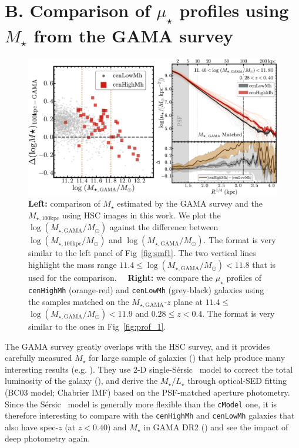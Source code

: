 \documentclass[a4paper,fleqn,usenatbib]{mnras}
\def\ser{{S\'{e}rsic\ }}
\def\rbcg{\texttt{cenHighMh}}
\def\nbcg{\texttt{cenLowMh}}
\def\mstar{{$M_{\star}$}}
\def\mtot{{$M_{\star,100\mathrm{kpc}}$}}
\def\mgama{{$M_{\star,\mathrm{GAMA}}$}}
\def\logmtot{{$\log (M_{\star,100\mathrm{kpc}}/M_{\odot})$}}
\def\logmgama{{$\log (M_{\star,\mathrm{GAMA}}/M_{\odot})$}}
\def\m2l{{$M_{\star}/L_{\star}$}}
\def\mden{{$\mu_{\star}$}}
\begin{document}
\section{B. Comparison of \mden{} profiles using \mstar{} from the GAMA survey}
    \label{app:gama} 

\begin{figure}
    \centering
    \includegraphics[width=\textwidth]{fig/redbcg_prof_gama_new}
    \caption{
        \textbf{Left:} comparison of \mstar{} estimated by the GAMA survey and 
        the \mtot{} using HSC images in this work. 
        We plot the \logmgama{} against the difference between \logmtot{} and \logmgama{}. 
        The format is very similar to the left panel of Fig~\ref{fig:smf1}. 
        The two vertical lines highlight the mass range $11.4 \leq$\logmgama{}$<11.8$ 
        that is used for the comparison.~~
        \textbf{Right:} we compare the \mden{} profiles of \rbcg{} (orange-red) and 
        \nbcg{} (grey-black) galaxies using the samples matched on the 
        \mgama{}-$z$ plane at $11.4 \leq$\logmgama{}$<11.9$ and $0.28 \leq z < 0.4$. 
        The format is very similar to the ones in Fig~\ref{fig:prof_1}.}
    \label{fig:gama}
\end{figure}

    The GAMA survey greatly overlaps with the HSC survey, and it provides carefully 
    measured \mstar{} for large sample of galaxies (\citealt{Taylor2011}) that help 
    produce many interesting results (e.g. \citealt{Bauer2013, Ferreras2017}).
    They use 2-D single-\ser{} model to correct the total luminosity of the galaxy 
    (\citealt{Kelvin2012}), and derive the \m2l{} through optical-SED fitting 
    (BC03 model; Chabrier IMF) based on the PSF-matched aperture photometry. 
    Since the \ser{} model is generally more flexible than the \texttt{cModel} one, 
    it is therefore interesting to compare with the \rbcg{} and \nbcg{} galaxies 
    that also have spec-$z$ (at $z < 0.40$) and \mstar{} in GAMA DR2 
    (\citealt{Liske2015}) and see the impact of deep photometry again. 
    
\end{document}
